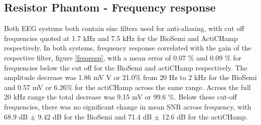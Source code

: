 \subsection{Resistor Phantom - Frequency response}
Both EEG systems both contain sinc filters used for anti-aliasing, with cut off frequencies quoted at 1.7 kHz and 7.5 kHz for the BioSemi and ActiCHamp respectively. In both systems, frequency response correlated with the gain of the respective filter, figure \ref{freqresp}, with a mean error of 0.07 \% and 0.09 \% for frequencies below the cut off for the BioSemi and actiCHamp respectively. The amplitude decrease was 1.86 mV V or 21.0\% from 20 Hz to 2 kHz for the BioSemi and 0.57 mV or 6.26\% for the actiCHamp across the same range. Across the full 20 kHz range the total decrease was 9.15 mV or  99.6 \%. Below these cut-off frequencies, there was no significant change in mean SNR across frequency, with 68.9 dB $\pm$ 9.42 dB for the BioSemi and 71.4 dB $\pm$ 12.6 dB for the actiCHamp.  